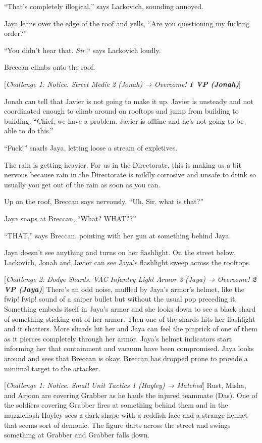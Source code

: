 ``That's completely illogical,'' says Lackovich, sounding annoyed.

Jaya leans over the edge of the roof and yells, ``Are you questioning my fucking order?''

``You didn't hear that.  \textit{Sir.}`` says Lackovich loudly.

Breccan climbs onto the roof.

{[}\textit{Challenge 1: Notice.  Street Medic 2 (Jonah) → Overcome! }\textit{\textbf{1 VP (Jonah)}}{]}

Jonah can tell that Javier is not going to make it up.  Javier is unsteady and not coordinated enough to climb around on rooftops and jump from building to building.  ``Chief, we have a problem.  Javier is offline and he's not going to be able to do this.''

``Fuck!'' snarls Jaya, letting loose a stream of expletives.

The rain is getting heavier.  For us in the Directorate, this is making us a bit nervous because rain in the Directorate is mildly corrosive and unsafe to drink so usually you get out of the rain as soon as you can.

Up on the roof, Breccan says nervously, ``Uh, Sir, what is that?''

Jaya snaps at Breccan, ``What?  WHAT??''

``THAT,'' says Breccan, pointing with her gun at something behind Jaya.

Jaya doesn't see anything and turns on her flashlight.  On the street below, Lackovich, Jonah and Javier can see Jaya's flashlight sweep across the rooftops.

{[}\textit{Challenge 2: Dodge Shards.  VAC Infantry Light Armor 3 (Jaya) → Overcome! }\textit{\textbf{2 VP (Jaya)}}{]} There's an odd noise, muffled by Jaya's armor's helmet, like the fwip! fwip! sound of a sniper bullet but without the usual pop preceding it.  Something embeds itself in Jaya's armor and she looks down to see a black shard of something sticking out of her armor.  Then one of the shards hits her flashlight and it shatters.  More shards hit her and Jaya can feel the pinprick of one of them as it pierces completely through her armor.  Jaya's helmet indicators start informing her that containment and vacuum have been compromised.  Jaya looks around and sees that Breccan is okay.  Breccan has dropped prone to provide a minimal target to the attacker.



{[}\textit{Challenge 1: Notice.  Small Unit Tactics 1 (Hayley) → Matched}{]}   Rust, Misha, and Arjoon are covering Grabber as he hauls the injured teammate (Das).  One of the soldiers covering Grabber fires at something behind them and in the muzzleflash Hayley sees a dark shape with a reddish face and a strange helmet that seems sort of demonic.  The figure darts across the street and swings something at Grabber and Grabber falls down.



